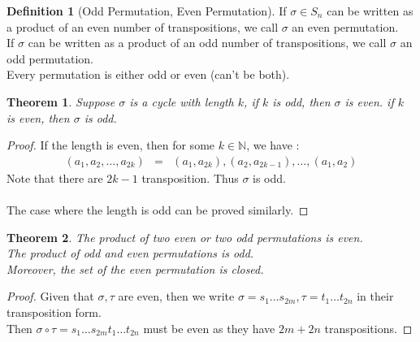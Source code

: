 \documentclass{article}
\theoremstyle{MyNonumberplain}
\theoremstyle{break}
\newtheorem*{proof}{Proof. }
\theoremstyle{break}
\newtheorem{theorem}{Theorem}[section]
\theoremstyle{break}
\theoremstyle{definition}
\theoremstyle{break}
\newtheorem{definition}{Definition}[section]
\begin{document}
\begin{defbox}
    \begin{definition}[Odd Permutation, Even Permutation]
        If $\sigma\in S_n$ can be written as a product of an even number of transpositions, we
        call $\sigma$ an even permutation. \\
        
        If $\sigma$ can be written as a product of an odd number of transpositions,
        we call $\sigma$ an odd permutation.\\

        Every permutation is either odd or even (can't be both).
    \end{definition}
\end{defbox}

\begin{thmbox}
    \begin{theorem}
        Suppose $\sigma$ is a cycle with length $k$, if $k$ is odd, then $\sigma$ is even. if $k$ is even, then $\sigma$ is odd.
    \end{theorem}
    \begin{prfbox}
        \begin{proof}
            If the length is even, then for some $k \in \mathbb{N}$, we have :
            \begin{eqnarray*}
                (a_1, a_2, \ldots, a_{2 k}) & = & (a_1, a_{2 k}), (a_2, a_{2 k - 1}),
                \ldots, (a_1, a_2)
            \end{eqnarray*}
            Note that there are $2 k - 1$ transposition. Thus $\sigma$ is odd. \\\\
            The case where the length is odd can be proved similarly.
        \end{proof}
    \end{prfbox}
\end{thmbox}

\begin{thmbox}
    \begin{theorem}
        The product of two even or two odd permutations is even.\\

        The product of odd and even permutations is odd. \\

        Moreover, the set of the even permutation is closed.
    \end{theorem}
    \begin{prfbox}
        \begin{proof}
            Given that $\sigma, \tau$ are even, then we write $\sigma = s_1 \ldots s_{2
            m}, \tau = t_1 \ldots t_{2 n}$ in their transposition form.\\

            Then $\sigma \circ \tau = s_1 \ldots s_{2 m} t_1 \ldots t_{2 n}$ must be even
            as they have $2 m + 2 n$ transpositions.
        \end{proof}
    \end{prfbox}
\end{thmbox}
\end{document}
